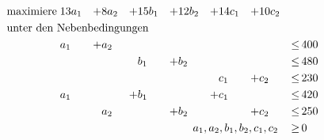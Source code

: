 \documentclass[10pt,a4paper,oneside,ngerman,numbers=noenddot]{scrartcl}
\begin{document}
	\subsection{} %
		\begin{alignat*}{7}
		\text{maximiere}\; & 13a_{1} &+& 8a_{2} &+& 15b_{1} &+& 12b_{2} &+& 14c_{1} &+& 10c_{2} &&  \\
		\multicolumn{14}{l}{\text{unter den Nebenbedingungen}} && \\
		& a_{1} &+& a_{2} && && && && &\leq &\, 400 \\
		& && && b_{1} &+& b_{2} && && &\leq &\, 480 \\
		& && && && && c_{1} &+& c_{2} &\leq &\, 230 \\
		& a_{1} && &+& b_{1} && &+& c_{1} && &\leq &\, 420 \\
		& && a_{2} && &+& b_{2} && &+& c_{2} &\leq &\, 250 \\
		\multicolumn{12}{r}{$a_{1}, a_{2}, b_{1}, b_{2}, c_{1}, c_{2}$} \,&\geq &\, 0
		\end{alignat*}
\end{document}
